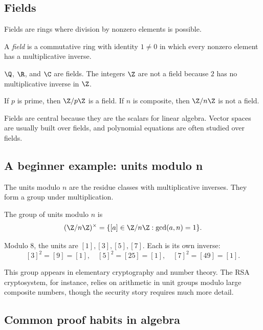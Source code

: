 \subsection{Fields}

Fields are rings where division by nonzero elements is possible.

\begin{definition}
A \emph{field} is a commutative ring with identity $1\neq 0$ in which every
nonzero element has a multiplicative inverse.
\end{definition}

\begin{example}
$\Q$, $\R$, and $\C$ are fields. The integers $\Z$ are not a field because
$2$ has no multiplicative inverse in $\Z$.
\end{example}

\begin{example}
If $p$ is prime, then $\Z/p\Z$ is a field. If $n$ is composite, then
$\Z/n\Z$ is not a field.
\end{example}

Fields are central because they are the scalars for linear algebra. Vector
spaces are usually built over fields, and polynomial equations are often studied
over fields.

\subsection{A beginner example: units modulo n}

The units modulo $n$ are the residue classes with multiplicative inverses. They
form a group under multiplication.

\begin{definition}
The group of units modulo $n$ is
\[
(\Z/n\Z)^\times=\{[a]\in\Z/n\Z:\gcd(a,n)=1\}.
\]
\end{definition}

\begin{example}
Modulo $8$, the units are $[1],[3],[5],[7]$. Each is its own inverse:
\[
[3]^2=[9]=[1],\quad [5]^2=[25]=[1],\quad [7]^2=[49]=[1].
\]
\end{example}

This group appears in elementary cryptography and number theory. The RSA
cryptosystem, for instance, relies on arithmetic in unit groups modulo large
composite numbers, though the security story requires much more detail.

\subsection{Common proof habits in algebra}

